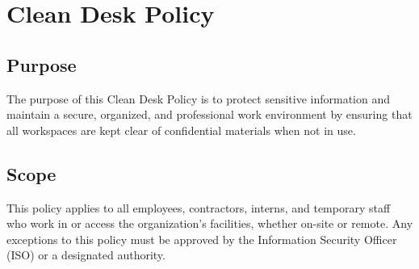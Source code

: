 \chapter{Clean Desk Policy}
\pagestyle{fancy}

\fancyhf{}

\fancyfoot[C]{\thepage}

\renewcommand{\headrulewidth}{0pt}
\renewcommand{\footrulewidth}{0pt}

\section{Purpose}
The purpose of this Clean Desk Policy is to protect sensitive information and maintain a secure, organized, and professional work environment by ensuring that all workspaces are kept clear of confidential materials when not in use.
\section{Scope}
This policy applies to all employees, contractors, interns, and temporary staff who work in or access the organization’s facilities, whether on-site or remote. Any exceptions to this policy must be approved by the Information Security Officer (ISO) or a designated authority.
